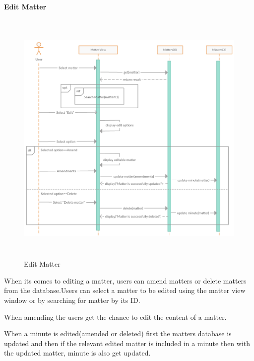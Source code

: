 \documentclass[a4paper,beamer]{article}
\begin{document}
		\textbf{Edit Matter}\newline
		\begin{figure}[h!]
			\begin{center}
			\includegraphics[width=6in,height=5in]{img/seq-edit-matter}
			\end{center}
			\caption{Edit Matter}
			\label{fig:edit-matter}
		\end{figure}
		        
		When its comes to editing a matter, users can amend matters or delete matters from the database.Users can select a matter to be edited using the matter view window or by searching for matter by its ID.
		
		When amending the users get the chance to edit the content of a matter.

		When a minute is edited(amended or deleted) first the matters database is updated and then if the relevant edited matter is included in a minute then with the updated matter, minute is also get updated.\newline
		\newpage
		
\end{document}

